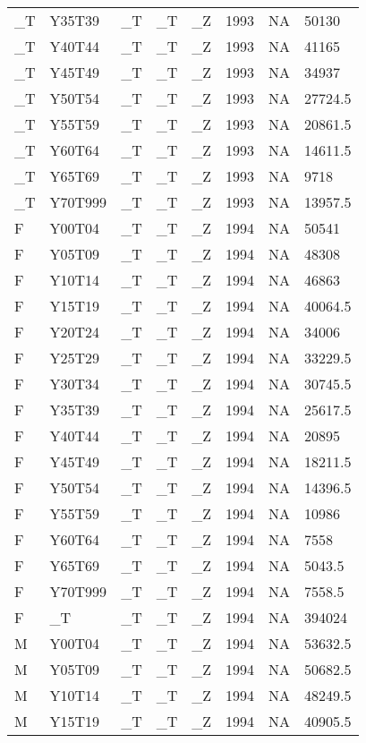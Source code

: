 \begin{longtable}[t]{llllllll}
\addlinespace
\_T & Y35T39 & \_T & \_T & \_Z & 1993 & NA & 50130\\
\_T & Y40T44 & \_T & \_T & \_Z & 1993 & NA & 41165\\
\_T & Y45T49 & \_T & \_T & \_Z & 1993 & NA & 34937\\
\_T & Y50T54 & \_T & \_T & \_Z & 1993 & NA & 27724.5\\
\_T & Y55T59 & \_T & \_T & \_Z & 1993 & NA & 20861.5\\
\addlinespace
\_T & Y60T64 & \_T & \_T & \_Z & 1993 & NA & 14611.5\\
\_T & Y65T69 & \_T & \_T & \_Z & 1993 & NA & 9718\\
\_T & Y70T999 & \_T & \_T & \_Z & 1993 & NA & 13957.5\\
F & Y00T04 & \_T & \_T & \_Z & 1994 & NA & 50541\\
F & Y05T09 & \_T & \_T & \_Z & 1994 & NA & 48308\\
\addlinespace
F & Y10T14 & \_T & \_T & \_Z & 1994 & NA & 46863\\
F & Y15T19 & \_T & \_T & \_Z & 1994 & NA & 40064.5\\
F & Y20T24 & \_T & \_T & \_Z & 1994 & NA & 34006\\
F & Y25T29 & \_T & \_T & \_Z & 1994 & NA & 33229.5\\
F & Y30T34 & \_T & \_T & \_Z & 1994 & NA & 30745.5\\
\addlinespace
F & Y35T39 & \_T & \_T & \_Z & 1994 & NA & 25617.5\\
F & Y40T44 & \_T & \_T & \_Z & 1994 & NA & 20895\\
F & Y45T49 & \_T & \_T & \_Z & 1994 & NA & 18211.5\\
F & Y50T54 & \_T & \_T & \_Z & 1994 & NA & 14396.5\\
F & Y55T59 & \_T & \_T & \_Z & 1994 & NA & 10986\\
\addlinespace
F & Y60T64 & \_T & \_T & \_Z & 1994 & NA & 7558\\
F & Y65T69 & \_T & \_T & \_Z & 1994 & NA & 5043.5\\
F & Y70T999 & \_T & \_T & \_Z & 1994 & NA & 7558.5\\
F & \_T & \_T & \_T & \_Z & 1994 & NA & 394024\\
M & Y00T04 & \_T & \_T & \_Z & 1994 & NA & 53632.5\\
\addlinespace
M & Y05T09 & \_T & \_T & \_Z & 1994 & NA & 50682.5\\
M & Y10T14 & \_T & \_T & \_Z & 1994 & NA & 48249.5\\
M & Y15T19 & \_T & \_T & \_Z & 1994 & NA & 40905.5\\

\end{longtable}
